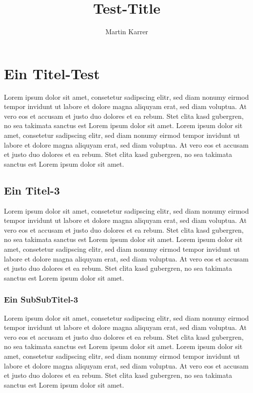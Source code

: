 \documentclass[10pt,a4paper]{report}
\author{Martin Karrer}
\title{Test-Title}
\begin{document}
\maketitle

\tableofcontents \newpage

\section{Ein Titel-Test}
Lorem ipsum dolor sit amet, consetetur sadipscing elitr, sed diam nonumy eirmod tempor invidunt ut labore et dolore magna aliquyam erat, sed diam voluptua. At vero eos et accusam et justo duo dolores et ea rebum. Stet clita kasd gubergren, no sea takimata sanctus est Lorem ipsum dolor sit amet. Lorem ipsum dolor sit amet, consetetur sadipscing elitr, sed diam nonumy eirmod tempor invidunt ut labore et dolore magna aliquyam erat, sed diam voluptua. At vero eos et accusam et justo duo dolores et ea rebum. Stet clita kasd gubergren, no sea takimata sanctus est Lorem ipsum dolor sit amet.
\subsection{Ein Titel-3}
Lorem ipsum dolor sit amet, consetetur sadipscing elitr, sed diam nonumy eirmod tempor invidunt ut labore et dolore magna aliquyam erat, sed diam voluptua. At vero eos et accusam et justo duo dolores et ea rebum. Stet clita kasd gubergren, no sea takimata sanctus est Lorem ipsum dolor sit amet. Lorem ipsum dolor sit amet, consetetur sadipscing elitr, sed diam nonumy eirmod tempor invidunt ut labore et dolore magna aliquyam erat, sed diam voluptua. At vero eos et accusam et justo duo dolores et ea rebum. Stet clita kasd gubergren, no sea takimata sanctus est Lorem ipsum dolor sit amet.
\subsubsection{Ein SubSubTitel-3}
Lorem ipsum dolor sit amet, consetetur sadipscing elitr, sed diam nonumy eirmod tempor invidunt ut labore et dolore magna aliquyam erat, sed diam voluptua. At vero eos et accusam et justo duo dolores et ea rebum. Stet clita kasd gubergren, no sea takimata sanctus est Lorem ipsum dolor sit amet. Lorem ipsum dolor sit amet, consetetur sadipscing elitr, sed diam nonumy eirmod tempor invidunt ut labore et dolore magna aliquyam erat, sed diam voluptua. At vero eos et accusam et justo duo dolores et ea rebum. Stet clita kasd gubergren, no sea takimata sanctus est Lorem ipsum dolor sit amet.
\end{document}
